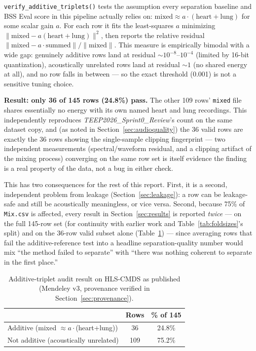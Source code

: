\documentclass[11pt]{article}
\begin{document}
\texttt{verify\_additive\_triplets()} tests the assumption every separation
baseline and BSS Eval score in this pipeline actually relies on: $\text{mixed}
\approx a\cdot(\text{heart} + \text{lung})$ for some scalar gain $a$. For
each row it fits the least-squares $a$ minimizing
$\lVert \text{mixed} - a(\text{heart}+\text{lung})\rVert^2$, then reports the
relative residual $\lVert \text{mixed} - a\cdot\text{summed}\rVert /
\lVert \text{mixed}\rVert$. This measure is empirically bimodal with a wide
gap: genuinely additive rows land at residual $\sim 10^{-8}$--$10^{-4}$
(limited by 16-bit quantization), acoustically unrelated rows land at
residual $\sim 1$ (no shared energy at all), and no row falls in between ---
so the exact threshold (0.001) is not a sensitive tuning choice.

\textbf{Result: only 36 of 145 rows (24.8\%) pass.} The other 109 rows'
\texttt{mixed} file shares essentially no energy with its own named heart
and lung recordings. This independently reproduces
\emph{TEEP2026\_Sprint0\_Review}'s count on the same dataset copy, and (as
noted in Section~\ref{sec:audioquality}) the 36 valid rows are exactly the
36 rows showing the single-sample clipping fingerprint --- two independent
measurements (spectral/waveform residual, and a clipping artifact of the
mixing process) converging on the same row set is itself evidence the
finding is a real property of the data, not a bug in either check.

This has two consequences for the rest of this report. First, it is a
second, independent problem from leakage (Section~\ref{sec:leakage}): a row
can be leakage-safe and still be acoustically meaningless, or vice versa.
Second, because 75\% of \texttt{Mix.csv} is affected, every result in
Section~\ref{sec:results} is reported \emph{twice} --- on the full 145-row
set (for continuity with earlier work and Table~\ref{tab:foldsizes}'s
split) and on the 36-row valid subset alone (Table~\ref{tab:additivesubset})
--- since averaging rows that fail the additive-reference test into a headline separation-quality number
would mix ``the method failed to separate'' with ``there was nothing
coherent to separate in the first place.''

\begin{table}[H]
\centering
\caption{Additive-triplet audit result on HLS-CMDS as published
(Mendeley v3, provenance verified in Section~\ref{sec:provenance}).}
\label{tab:additivesubset}
\begin{tabular}{@{}lcc@{}}
\toprule
 & Rows & \% of 145 \\
\midrule
Additive (mixed $\approx a\cdot$(heart+lung)) & 36 & 24.8\% \\
Not additive (acoustically unrelated) & 109 & 75.2\% \\
\bottomrule
\end{tabular}
\end{table}
\end{document}
